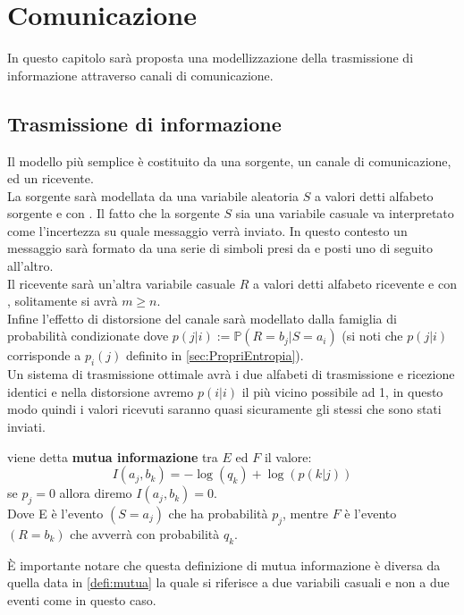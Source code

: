 \chapter{Comunicazione}

In questo capitolo sarà proposta una modellizzazione della trasmissione di informazione attraverso canali di comunicazione. 

\section{Trasmissione di informazione}
\label{sec:Trasmissione}

Il modello più semplice è costituito da una sorgente, un canale di comunicazione, ed un ricevente.\\
La sorgente sarà modellata da una variabile aleatoria $S$ a valori \va detti alfabeto sorgente e con \lep. Il fatto che la sorgente $S$ sia una variabile casuale va interpretato come l'incertezza su quale messaggio verrà inviato. In questo contesto un messaggio sarà formato da una serie di simboli presi da \va e posti uno di seguito all'altro.\\
Il ricevente sarà un'altra variabile casuale $R$ a valori \vb  detti alfabeto ricevente e con \leggeq, solitamente si avrà $m \geq n$.\\
Infine l'effetto di distorsione del canale sarà modellato dalla famiglia di probabilità condizionate \lepc  dove $p(j|i):= \mathbb{P}(R=b_j|S=a_i)$ (si noti che $p(j|i)$ corrisponde a $p_i(j)$ definito in \ref{sec:PropriEntropia}).\\
Un sistema di trasmissione ottimale avrà i due alfabeti di trasmissione e ricezione identici e nella distorsione avremo $p(i|i)$ il più vicino possibile ad 1, in questo modo quindi i valori ricevuti saranno quasi sicuramente gli stessi che sono stati inviati.\\
\begin{defi}
viene detta \textbf{mutua informazione}  tra $E$ ed $F$ il valore:
\begin{equation}
I(a_j,b_k)=- \log(q_k)+ \log(p(k|j))
\end{equation}
se $p_j=0$ allora diremo $I(a_j,b_k)=0$.\\
Dove E è l'evento $(S=a_j)$ che ha probabilità $p_j$, mentre $F$ è l'evento $(R=b_k)$ che avverrà con probabilità $q_k$.
\end{defi}
È importante notare che questa definizione di mutua informazione è diversa da quella data in \ref{defi:mutua} la quale si riferisce a due variabili casuali e non a due eventi come in questo caso.\\
